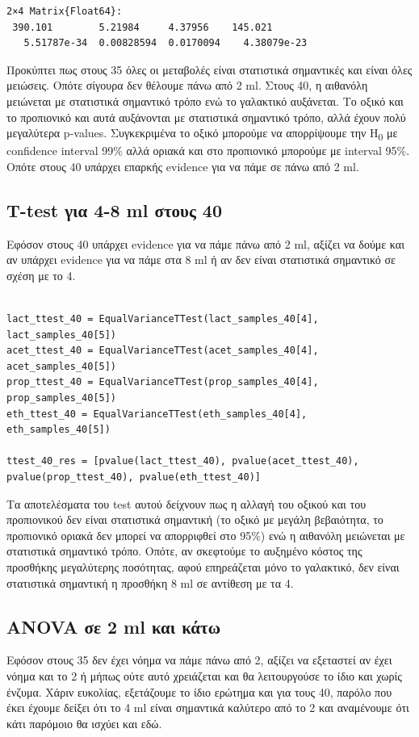 \documentclass[11pt]{article}
\begin{document}
\begin{verbatim}
2×4 Matrix{Float64}:
 390.101        5.21984     4.37956    145.021
   5.51787e-34  0.00828594  0.0170094    4.38079e-23
\end{verbatim}


Προκύπτει πως στους 35 όλες οι μεταβολές είναι στατιστικά σημαντικές και είναι όλες μειώσεις. Οπότε σίγουρα δεν θέλουμε πάνω από 2 ml. Στους 40, η αιθανόλη μειώνεται με στατιστικά σημαντικό τρόπο ενώ το γαλακτικό αυξάνεται. Το οξικό και το προπιονικό και αυτά αυξάνονται με στατιστικά σημαντικό τρόπο, αλλά έχουν πολύ μεγαλύτερα p-values. Συγκεκριμένα το οξικό μπορούμε να απορρίψουμε την H\textsubscript{0} με confidence interval 99\% αλλά οριακά και στο προπιονικό μπορούμε με interval 95\%. Οπότε στους 40 υπάρχει επαρκής evidence για να πάμε σε πάνω από 2 ml.

\subsection{T-test για 4-8 ml στους 40}
\label{sec:orgcb8ade1}
Εφόσον στους 40 υπάρχει evidence για να πάμε πάνω από 2 ml, αξίζει να δούμε και αν υπάρχει evidence για να πάμε στα 8 ml ή αν δεν είναι στατιστικά σημαντικό σε σχέση με το 4.

\begin{verbatim}

lact_ttest_40 = EqualVarianceTTest(lact_samples_40[4], lact_samples_40[5])
acet_ttest_40 = EqualVarianceTTest(acet_samples_40[4], acet_samples_40[5])
prop_ttest_40 = EqualVarianceTTest(prop_samples_40[4], prop_samples_40[5])
eth_ttest_40 = EqualVarianceTTest(eth_samples_40[4], eth_samples_40[5])

ttest_40_res = [pvalue(lact_ttest_40), pvalue(acet_ttest_40), pvalue(prop_ttest_40), pvalue(eth_ttest_40)]
\end{verbatim}

Τα αποτελέσματα του test αυτού δείχνουν πως η αλλαγή του οξικού και του προπιονικού δεν είναι στατιστικά σημαντική (το οξικό με μεγάλη βεβαιότητα, το προπιονικό οριακά δεν μπορεί να απορριφθεί στο 95\%) ενώ η αιθανόλη μειώνεται με στατιστικά σημαντικό τρόπο. Οπότε, αν σκεφτούμε το αυξημένο κόστος της προσθήκης μεγαλύτερης ποσότητας, αφού επηρεάζεται μόνο το γαλακτικό, δεν είναι στατιστικά σημαντική η προσθήκη 8 ml σε αντίθεση με τα 4.

\subsection{ANOVA σε 2 ml και κάτω}
\label{sec:orgc7bd2e4}
Εφόσον στους 35 δεν έχει νόημα να πάμε πάνω από 2, αξίζει να εξεταστεί αν έχει νόημα και το 2 ή μήπως ούτε αυτό χρειάζεται και θα λειτουργούσε το ίδιο και χωρίς ένζυμα. Χάριν ευκολίας, εξετάζουμε το ίδιο ερώτημα και για τους 40, παρόλο που έκει έχουμε δείξει ότι το 4 ml είναι σημαντικά καλύτερο από το 2 και αναμένουμε ότι κάτι παρόμοιο θα ισχύει και εδώ.
\end{document}
